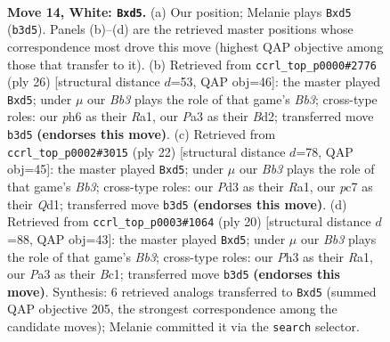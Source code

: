 \documentclass[11pt]{article}
\begin{document}
\clearpage

\begin{figure}[p]\centering
\begin{subfigure}{0.46\textwidth}\centering
\resizebox{\linewidth}{!}{%
\newchessgame
\chessboard[
  setfen={r2qrbk1/1bp2pp1/p1np3p/1p1np3/4P3/PB1P1N1P/1PPB1PP1/R2QR1K1 w - - 0 14},
  showmover=false,
  pgfstyle=straightmove, color=movearrow, markmove={b3-d5}
]}
\caption{}
\end{subfigure}\hfill
\begin{subfigure}{0.46\textwidth}\centering
\resizebox{\linewidth}{!}{%
\newchessgame
\chessboard[
  setfen={r3r1k1/1bpqbpp1/p1np3p/1p1np3/4P3/PB1P1N1P/1PPB1PP1/R2QR1K1 w - - 0 14},
  showmover=false,
  pgfstyle=straightmove, color=movearrow, markmove={b3-d5}
]}
\caption{}
\end{subfigure}
\\[4pt]
\begin{subfigure}{0.46\textwidth}\centering
\resizebox{\linewidth}{!}{%
\newchessgame
\chessboard[
  setfen={r2qr1k1/1bp1bppp/p1np4/1p1np3/4P3/PB1P1N2/1PP2PPP/R1BQR1K1 w - - 0 12},
  showmover=false,
  pgfstyle=straightmove, color=movearrow, markmove={b3-d5}
]}
\caption{}
\end{subfigure}\hfill
\begin{subfigure}{0.46\textwidth}\centering
\resizebox{\linewidth}{!}{%
\newchessgame
\chessboard[
  setfen={r2q1rk1/1bp1bppp/p1np4/1p1np3/4P3/1B1P1N1P/PPP2PP1/R1BQ1RK1 w - - 0 11},
  showmover=false,
  pgfstyle=straightmove, color=movearrow, markmove={b3-d5}
]}
\caption{}
\end{subfigure}
\caption{\textbf{Move 14, White: \texttt{Bxd5}.} (a) Our position; Melanie plays \texttt{Bxd5} (\texttt{b3d5}). Panels (b)--(d) are the retrieved master positions whose correspondence most drove this move (highest QAP objective among those that transfer to it). (b) Retrieved from \texttt{ccrl\_top\_p0000\#2776} (ply 26) [structural distance $d$=53, QAP obj=46]: the master played \texttt{Bxd5}; under $\mu$ our \emph{Bb3} plays the role of that game's \emph{Bb3}; cross-type roles: our \emph{p}h6 as their \emph{R}a1, our \emph{P}a3 as their \emph{B}d2; transferred move \texttt{b3d5} \textbf{(endorses this move)}. (c) Retrieved from \texttt{ccrl\_top\_p0002\#3015} (ply 22) [structural distance $d$=78, QAP obj=45]: the master played \texttt{Bxd5}; under $\mu$ our \emph{Bb3} plays the role of that game's \emph{Bb3}; cross-type roles: our \emph{P}d3 as their \emph{R}a1, our \emph{p}c7 as their \emph{Q}d1; transferred move \texttt{b3d5} \textbf{(endorses this move)}. (d) Retrieved from \texttt{ccrl\_top\_p0003\#1064} (ply 20) [structural distance $d$=88, QAP obj=43]: the master played \texttt{Bxd5}; under $\mu$ our \emph{Bb3} plays the role of that game's \emph{Bb3}; cross-type roles: our \emph{P}h3 as their \emph{R}a1, our \emph{P}a3 as their \emph{B}c1; transferred move \texttt{b3d5} \textbf{(endorses this move)}. Synthesis: 6 retrieved analogs transferred to \texttt{Bxd5} (summed QAP objective 205, the strongest correspondence among the candidate moves); Melanie committed it via the \texttt{search} selector.}
\label{fig:thought-m26}
\end{figure}
\end{document}
